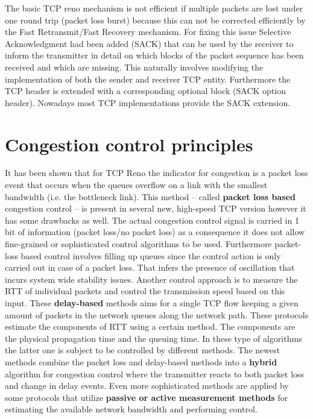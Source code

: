 \documentclass[a4paper]{article}
\begin{document}
The basic TCP reno mechanism is not efficient if multiple packets are lost under one round trip (packet loss burst)
because this can not be corrected efficiently by the Fast Retransmit/Fast Recovery mechanism. For fixing this issue
Selective Acknowledgment had been added (SACK) that can be used by the receiver to inform the transmitter in detail on
which blocks of the packet sequence has been received and which are missing. This naturally involves modifying the
implementation of both the sender and receiver TCP entity. Furthermore the TCP header is extended with a corresponding
optional block (SACK option header). Nowadays most TCP implementations provide the SACK extension.

\section{Congestion control principles}

It has been shown that for TCP Reno the indicator for congestion is a packet loss event that occurs when the queues
overflow on a link with the smallest bandwidth (i.e. the bottleneck link). This method -- called \textbf{packet loss
    based} congestion control -- is present in several new, high-speed TCP version however it has some drawbacks as
well.
The actual congestion control signal is carried in 1 bit of information (packet loss/no packet loss) as a consequence
it does not allow fine-grained or sophisticated control algorithms to be used. Furthermore packet-loss based control
involves filling up queues since the control action is only carried out in case of a packet loss. That infers the
presence of oscillation that incurs  system wide stability issues. Another control approach is to measure the RTT of
individual packets and control the transmission speed based on this input. These \textbf{delay-based} methods aims for
a single TCP flow keeping a given amount of packets in the network queues along the network path. These protocols
estimate the components of RTT using a certain method. The components are the physical propagation time and the queuing
time. In these type of algorithms the latter one is subject to be controlled by different methods.
The newest methods combine the packet loss and delay-based methods into a \textbf{hybrid} algorithm for congestion
control where the transmitter reacts to both packet loss and change in delay events. Even more sophisticated methods
are applied by some protocols that utilize \textbf{passive or active measurement methods} for estimating the available
network bandwidth and performing control.
\end{document}
